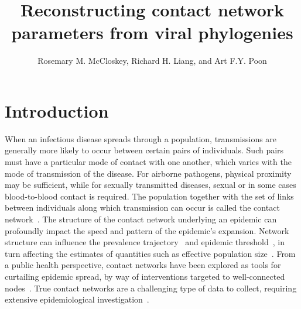 \documentclass[12pt]{article}\usepackage[]{graphicx}\usepackage[]{color}
\begin{document}
\onehalfspacing

\newcommand{\tablepath}{../tables}
\graphicspath{{../figures/}}

\title{Reconstructing contact network parameters from viral phylogenies}
\author{Rosemary M. McCloskey, Richard H. Liang, and Art F.Y. Poon}
\abstract{}



\maketitle

\section{Introduction}

When an infectious disease spreads through a population, transmissions are
generally more likely to occur between certain pairs of individuals. Such pairs
must have a particular mode of contact with one another, which varies with the
mode of transmission of the disease. For airborne pathogens, physical proximity
may be sufficient, while for sexually transmitted diseases, sexual or in some
cases blood-to-blood contact is required. The population together with the set
of links between individuals along which transmission can occur is called the
contact network~\autocite{klovdahl1985social, morris1993epidemiology}. The
structure of the contact network underlying an epidemic can profoundly impact
the speed and pattern of the epidemic's expansion. Network structure can
influence the prevalence trajectory~\autocite{o2011contact} and epidemic
threshold~\autocite{barthelemy2005dynamical}, in turn affecting the estimates of
quantities such as effective population size~\autocite{goodreau2006assessing}.
From a public health perspective, contact networks have been explored as tools
for curtailing epidemic spread, by way of interventions targeted to
well-connected nodes~\autocite{wang2015targeting}. True contact networks are a
challenging type of data to collect, requiring extensive epidemiological
investigation~\autocite{welch2011statistical}.
\end{document}
